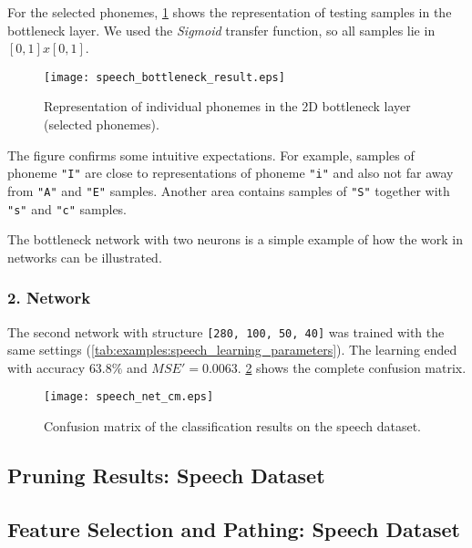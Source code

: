 For the selected phonemes, \cref{fig:examples:speech_bottleneck_result} shows the representation of testing samples in the bottleneck layer. We used the \textit{Sigmoid} transfer function, so all samples lie in $ [0,1] x [0,1] $.

\begin{figure}[H]
\centering
\texttt{[image: speech\_bottleneck\_result.eps]}
\caption{Representation of individual phonemes in the 2D bottleneck layer (selected phonemes).}
\label{fig:examples:speech_bottleneck_result}
\end{figure}

The figure confirms some intuitive expectations. For example, samples of phoneme \texttt{"I"} are close to representations of phoneme \texttt{"i"} and also not far away from \texttt{"A"} and \texttt{"E"} samples. Another area contains samples of \texttt{"S"} together with \texttt{"s"} and \texttt{"c"} samples.

The bottleneck network with two neurons is a simple example of how the work in networks can be illustrated.

\subsubsection*{2. Network}
The second network with structure \texttt{[280, 100, 50, 40]} was trained with the same settings (\cref{tab:examples:speech_learning_parameters}). The learning ended with accuracy $ 63.8\% $ and $ MSE' = 0.0063 $. \cref{fig:examples:speech_net_cm} shows the complete confusion matrix.

\begin{figure}[H]
\centering
\texttt{[image: speech\_net\_cm.eps]}
\caption{Confusion matrix of the classification results on the speech dataset.}
\label{fig:examples:speech_net_cm}
\end{figure}

\subsection*{Pruning Results: Speech Dataset}

\subsection*{Feature Selection and Pathing: Speech Dataset}